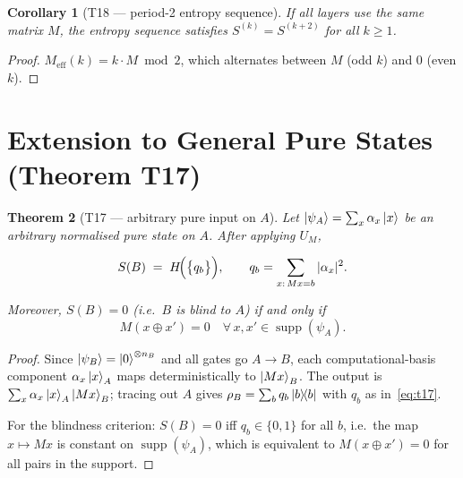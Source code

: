 \documentclass[11pt,a4paper]{article}
\newtheorem{theorem}{Theorem}[section]
\newtheorem{corollary}[theorem]{Corollary}
\newcommand{\Hbin}{H}
\newcommand{\VNE}{S}
\newcommand{\supp}{\operatorname{supp}}
\begin{document}
\begin{corollary}[T18 --- period-2 entropy sequence]
\label{cor:t18}
If all layers use the same matrix $M$, the entropy sequence satisfies
$\VNE^{(k)} = \VNE^{(k+2)}$ for all $k \geq 1$.
\end{corollary}

\begin{proof}
$M_{\mathrm{eff}}(k) = k \cdot M \bmod 2$, which alternates between $M$
(odd $k$) and $0$ (even $k$).
\end{proof}

\section{Extension to General Pure States (Theorem T17)}
\label{sec:pure}

\begin{theorem}[T17 --- arbitrary pure input on $A$]
\label{thm:t17}
Let $\ket{\psi_A} = \sum_x \alpha_x \ket{x}$ be an arbitrary normalised
pure state on $A$.  After applying $U_M$,

\begin{equation}
  \VNE(B) \;=\; \Hbin\!\Bigl(\bigl\{q_b\bigr\}\Bigr),
  \qquad
  q_b = \sum_{x:\, Mx = b} |\alpha_x|^2.
  \label{eq:t17}
\end{equation}

Moreover, $\VNE(B) = 0$ (i.e.\ $B$ is \emph{blind} to $A$) if and only if
\begin{equation}
  M(x \oplus x') = 0 \quad
  \forall\, x, x' \in \supp(\psi_A).
  \label{eq:blindness}
\end{equation}
\end{theorem}

\begin{proof}
Since $\ket{\psi_B} = \ket{0}^{\otimes n_B}$ and all gates go $A \to B$,
each computational-basis component $\alpha_x\ket{x}_A$ maps deterministically
to $\ket{Mx}_B$.  The output is $\sum_x \alpha_x \ket{x}_A\ket{Mx}_B$;
tracing out $A$ gives $\rho_B = \sum_b q_b \ketbra{b}{b}$ with $q_b$
as in~\eqref{eq:t17}.

For the blindness criterion: $\VNE(B) = 0$ iff $q_b \in \{0,1\}$ for all $b$,
i.e.\ the map $x \mapsto Mx$ is constant on $\supp(\psi_A)$, which is
equivalent to $M(x \oplus x') = 0$ for all pairs in the support.
\end{proof}

\end{document}
